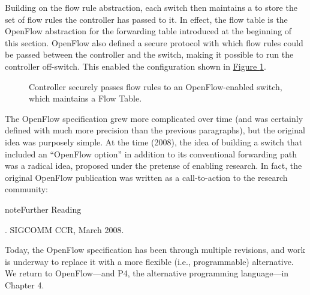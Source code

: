 \documentclass[letterpaper,11pt,english]{sphinxmanual}
\let\sphinxpxdimen\pdfpxdimen\else\newdimen\sphinxpxdimen
\begin{document}
Building on the flow rule abstraction, each switch then maintains a
 to store the set of flow rules the controller has passed
to it. In effect, the flow table is the OpenFlow abstraction for the
forwarding table introduced at the beginning of this section. OpenFlow
also defined a secure protocol with which flow rules could be passed
between the controller and the switch, making it possible to run the
controller off-switch. This enabled the configuration shown in
\hyperref[\detokenize{intro:fig-flowtab}]{Figure \ref{\detokenize{intro:fig-flowtab}}}.

\begin{figure}[htbp]
\centering
\capstart

\noindent\sphinxincludegraphics[width=500\sphinxpxdimen]{{Slide4}.png}
\caption{Controller securely passes flow rules to an OpenFlow-enabled
switch, which maintains a Flow Table.}\label{\detokenize{intro:id13}}\label{\detokenize{intro:fig-flowtab}}\end{figure}

The OpenFlow specification grew more complicated over time (and was
certainly defined with much more precision than the previous
paragraphs), but the original idea was purposely simple. At the time
(2008), the idea of building a switch that included an “OpenFlow option”
in addition to its conventional forwarding path was a radical idea,
proposed under the pretense of enabling research. In fact, the
original OpenFlow publication was written as a call-to-action to the
research community:

\label{\detokenize{intro:reading-openflow}}
\begin{sphinxadmonition}{note}{Further Reading}

.
SIGCOMM CCR, March 2008.
\end{sphinxadmonition}

Today, the OpenFlow specification has been through multiple revisions,
and work is underway to replace it with a more flexible (i.e.,
programmable) alternative. We return to OpenFlow—and P4, the
alternative programming language—in Chapter 4.
\end{document}
